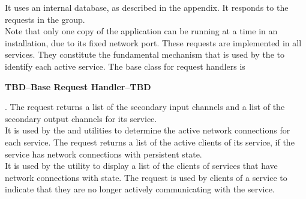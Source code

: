 It uses an internal database, as described in the
 appendix.
It responds to the requests in the
 group.\\

Note that only one copy of the 
application can be running at a time in an \mplusm{} installation, due to its fixed
\yarp{} network port.
\secondaryEnd{}
These requests are implemented in all \mplusm{} services.
They constitute the fundamental mechanism that is used by the
 to identify each active service.
The base class for request handlers is
\begin{Large}\textbf{TBD--Base Request Handler--TBD}\end{Large}.
The  request returns a list of the secondary input
channels and a list of the secondary output channels for its service.\\

It is used by the  and
 utilities to determine the active \yarp{}
network connections for each service.
The  request returns a list of the active clients of
its service, if the service has \yarp{} network connections with persistent state.\\

It is used by the  utility to display a list of the clients
of services that have \yarp{} network connections with state.
The  request is used by clients of a service to
indicate that they are no longer actively communicating with the service.\\

